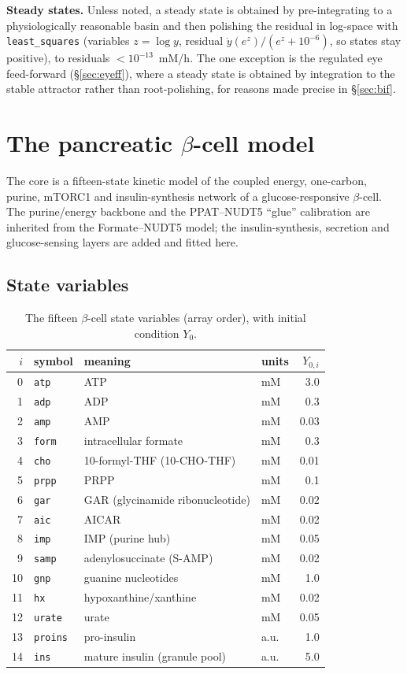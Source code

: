 \documentclass[11pt]{article}
\begin{document}
\textbf{Steady states.} Unless noted, a steady state is obtained by
pre-integrating to a physiologically reasonable basin and then polishing the
residual in log-space with \texttt{least\_squares} (variables $z=\log y$, residual
$\dot y(e^{z})/(e^{z}+10^{-6})$, so states stay positive), to residuals
$<10^{-13}$~mM/h. The one exception is the regulated eye feed-forward
(\S\ref{sec:eyeff}), where a steady state is obtained by integration to the stable
attractor rather than root-polishing, for reasons made precise in
\S\ref{sec:bif}.

\section{The pancreatic $\beta$-cell model}\label{sec:beta}

The core is a fifteen-state kinetic model of the coupled energy, one-carbon,
purine, mTORC1 and insulin-synthesis network of a glucose-responsive
$\beta$-cell. The purine/energy backbone and the PPAT--NUDT5 ``glue'' calibration
are inherited from the Formate--NUDT5 model; the insulin-synthesis, secretion and
glucose-sensing layers are added and fitted here.

\subsection{State variables}
\begin{table}[h]\centering\small
\caption{The fifteen $\beta$-cell state variables (array order), with initial
condition $Y_0$.}
\begin{tabular}{@{}rlll r@{}}
\toprule
$i$ & symbol & meaning & units & $Y_{0,i}$\\
\midrule
0 & \texttt{atp} & ATP & mM & 3.0\\
1 & \texttt{adp} & ADP & mM & 0.3\\
2 & \texttt{amp} & AMP & mM & 0.03\\
3 & \texttt{form} & intracellular formate & mM & 0.3\\
4 & \texttt{cho} & 10-formyl-THF (10-CHO-THF) & mM & 0.01\\
5 & \texttt{prpp} & PRPP & mM & 0.1\\
6 & \texttt{gar} & GAR (glycinamide ribonucleotide) & mM & 0.02\\
7 & \texttt{aic} & AICAR & mM & 0.02\\
8 & \texttt{imp} & IMP (purine hub) & mM & 0.05\\
9 & \texttt{samp} & adenylosuccinate (S-AMP) & mM & 0.02\\
10 & \texttt{gnp} & guanine nucleotides & mM & 1.0\\
11 & \texttt{hx} & hypoxanthine/xanthine & mM & 0.02\\
12 & \texttt{urate} & urate & mM & 0.05\\
13 & \texttt{proins} & pro-insulin & a.u. & 1.0\\
14 & \texttt{ins} & mature insulin (granule pool) & a.u. & 5.0\\
\bottomrule
\end{tabular}
\end{table}
\end{document}
